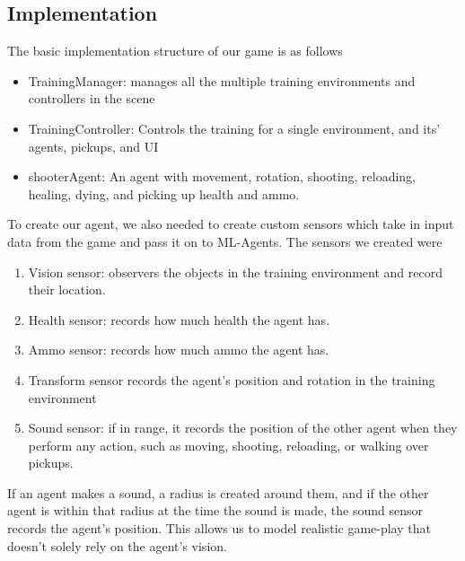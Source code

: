 \documentclass[a4paper,12pt,twocolumn]{article}
\begin{document}
\subsection{Implementation}
The basic implementation structure of our game is as follows
\begin{itemize}
    \item TrainingManager: manages all the multiple training environments and controllers in the scene
    \item TrainingController: Controls the training for a single environment, and its' agents, pickups, and UI
    \item shooterAgent: An agent with movement, rotation, shooting, reloading, healing, dying, and picking up health and ammo.
\end{itemize}
To create our agent, we also needed to create custom sensors which take in input data from the game and pass it on to ML-Agents. The sensors we created were
\begin{enumerate}
    \item Vision sensor: observers the objects in the training environment and record their location.
    \item Health sensor: records how much health the agent has.
    \item Ammo sensor: records how much ammo the agent has.
    \item Transform sensor records the agent's position and rotation in the training environment
    \item Sound sensor: if in range, it records the position of the other agent when they perform any action, such as moving, shooting, reloading, or walking over pickups. 
\end{enumerate}
If an agent makes a sound, a radius is created around them, and if the other agent is within that radius at the time the sound is made, the sound sensor records the agent's position. This allows us to model realistic game-play that doesn't solely rely on the agent's vision.
\end{document}
